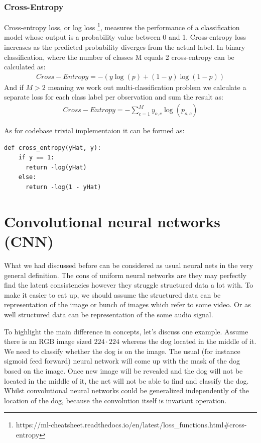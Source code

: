 \subsubsection{Cross-Entropy}
Cross-entropy loss, or log loss \footnote{https://ml-cheatsheet.readthedocs.io/en/latest/loss_functions.html#cross-entropy}, measures the performance of a classification model whose output is a probability value between 0 and 1. Cross-entropy loss increases as the predicted probability diverges from the actual label.
In binary classification, where the number of classes M equals 2 cross-entropy can be calculated as:
\begin{align*}
Cross-Entropy = -{(y\log(p) + (1 - y)\log(1 - p))}
\end{align*}
And if $M > 2$ meaning we work out multi-classification problem we calculate a separate loss for each class label per observation and sum the result as:
\begin{align*}
Cross-Entropy = -\sum_{c=1}^My_{o,c}\log(p_{o,c})
\end{align*}

As for codebase trivial implementaion it can be formed as:  
\begin{lstlisting}
def cross_entropy(yHat, y):
    if y == 1:
      return -log(yHat)
    else:
      return -log(1 - yHat)
\end{lstlisting}


\section{Convolutional neural networks (CNN)}
What we had discussed before can be considered as usual neural nets in the very general definition. The cons of uniform neural networks are they may perfectly find the latent consistencies however they struggle structured data a lot with. To make it easier to eat up, we should assume the structured data can be representation of the image or bunch of images which refer to some video. Or as well structured data can be representation of the some audio signal.

To highlight the main difference in concepts, let's discuss one example.
Assume there is an RGB image sized $224 \cdot 224$ whereas the dog located in the middle of it. We need to classify whether the dog is on the image. The usual (for instance sigmoid feed forward) neural network will come up with the mask of the dog based on the image. Once new image will be revealed and the dog will not be located in the middle of it, the net will not be able to find and classify the dog. Whilst convolutional neural networks could be generalized independently of the location of the dog, because the convolution itself is invariant operation.         

